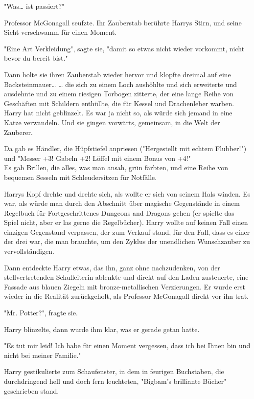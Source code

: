 {"Was… ist passiert?"

Professor McGonagall seufzte. Ihr Zauberstab berührte Harrys Stirn, und seine Sicht verschwamm für einen Moment.

"Eine Art Verkleidung", sagte sie, "damit so etwas nicht wieder vorkommt, nicht bevor du bereit bist."

Dann holte sie ihren Zauberstab wieder hervor und klopfte dreimal auf eine Backsteinmauer… … die sich zu einem Loch aushöhlte und sich erweiterte und ausdehnte und zu einem riesigen Torbogen zitterte, der eine lange Reihe von Geschäften mit Schildern enthüllte, die für Kessel und Drachenleber warben. Harry hat nicht geblinzelt. Es war ja nicht so, als würde sich jemand in eine Katze verwandeln. Und sie gingen vorwärts, gemeinsam, in die Welt der Zauberer.

Da gab es Händler, die Hüpfstiefel anpriesen ("Hergestellt mit echtem Flubber!") und "Messer +3! Gabeln +2! Löffel mit einem Bonus von +4!"\\ Es gab Brillen, die alles, was man ansah, grün färbten, und eine Reihe von bequemen Sesseln mit Schleudersitzen für Notfälle.

Harrys Kopf drehte und drehte sich, als wollte er sich von seinem Hals winden. Es war, als würde man durch den Abschnitt über magische Gegenstände in einem Regelbuch für Fortgeschrittenes Dungeons and Dragons gehen (er spielte das Spiel nicht, aber er las gerne die Regelbücher). Harry wollte auf keinen Fall einen einzigen Gegenstand verpassen, der zum Verkauf stand, für den Fall, dass es einer der drei war, die man brauchte, um den Zyklus der unendlichen Wunschzauber zu vervollständigen.

Dann entdeckte Harry etwas, das ihn, ganz ohne nachzudenken, von der stellvertretenden Schulleiterin ablenkte und direkt auf den Laden zusteuerte, eine Fassade aus blauen Ziegeln mit bronze-metallischen Verzierungen. Er wurde erst wieder in die Realität zurückgeholt, als Professor McGonagall direkt vor ihn trat.

"Mr. Potter?", fragte sie.

Harry blinzelte, dann wurde ihm klar, was er gerade getan hatte.

"Es tut mir leid! Ich habe für einen Moment vergessen, dass ich bei Ihnen bin und nicht bei meiner Familie."

Harry gestikulierte zum Schaufenster, in dem in feurigen Buchstaben, die durchdringend hell und doch fern leuchteten, "Bigbam's brilliante Bücher" geschrieben stand.

}
